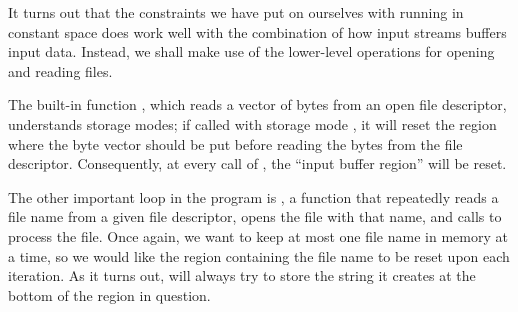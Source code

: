 \documentclass[12pt]{book}
\begin{document}
It turns out that the constraints we have put on ourselves with running in
constant space does work well with the combination of how  input
streams buffers input data. Instead, we shall make use of the lower-level
 operations for opening and reading files.

The built-in function , which reads a vector of bytes from
an open file descriptor, understands storage modes; if called with storage mode
, it will reset the region where the byte vector should be put before
reading the bytes from the file descriptor.  Consequently, at every call of
, the ``input buffer region'' will be reset.

The other important loop in the program is , a function that
repeatedly reads a file name from a given file descriptor, opens the file with
that name, and calls  to process the file. Once again, we want to keep
at most one file name in memory at a time, so we would like the region
containing the file name to be reset upon each iteration.  As it turns out,
 will always try to store the string it creates at the bottom of
the region in question.
\end{document}

